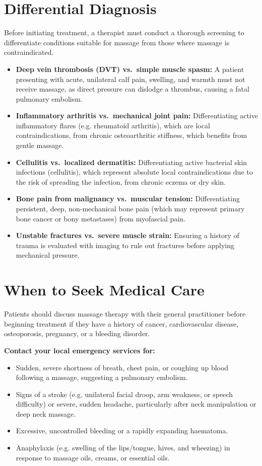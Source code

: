 \section*{Differential Diagnosis}
Before initiating treatment, a therapist must conduct a thorough screening to differentiate conditions suitable for massage from those where massage is contraindicated.
\begin{itemize}
    \item \textbf{Deep vein thrombosis (DVT) vs.\ simple muscle spasm:} A patient presenting with acute, unilateral calf pain, swelling, and warmth must not receive massage, as direct pressure can dislodge a thrombus, causing a fatal pulmonary embolism.
    \item \textbf{Inflammatory arthritis vs.\ mechanical joint pain:} Differentiating active inflammatory flares (e.g. rheumatoid arthritis), which are local contraindications, from chronic osteoarthritic stiffness, which benefits from gentle massage.
    \item \textbf{Cellulitis vs.\ localized dermatitis:} Differentiating active bacterial skin infections (cellulitis), which represent absolute local contraindications due to the risk of spreading the infection, from chronic eczema or dry skin.
    \item \textbf{Bone pain from malignancy vs.\ muscular tension:} Differentiating persistent, deep, non-mechanical bone pain (which may represent primary bone cancer or bony metastases) from myofascial pain.
    \item \textbf{Unstable fractures vs.\ severe muscle strain:} Ensuring a history of trauma is evaluated with imaging to rule out fractures before applying mechanical pressure.
\end{itemize}

\section*{When to Seek Medical Care}
Patients should discuss massage therapy with their general practitioner before beginning treatment if they have a history of cancer, cardiovascular disease, osteoporosis, pregnancy, or a bleeding disorder.

\textbf{Contact your local emergency services for:}
\begin{itemize}
    \item Sudden, severe shortness of breath, chest pain, or coughing up blood following a massage, suggesting a pulmonary embolism.
    \item Signs of a stroke (e.g. unilateral facial droop, arm weakness, or speech difficulty) or severe, sudden headache, particularly after neck manipulation or deep neck massage.
    \item Excessive, uncontrolled bleeding or a rapidly expanding haematoma.
    \item Anaphylaxis (e.g. swelling of the lips/tongue, hives, and wheezing) in response to massage oils, creams, or essential oils.
\end{itemize}


